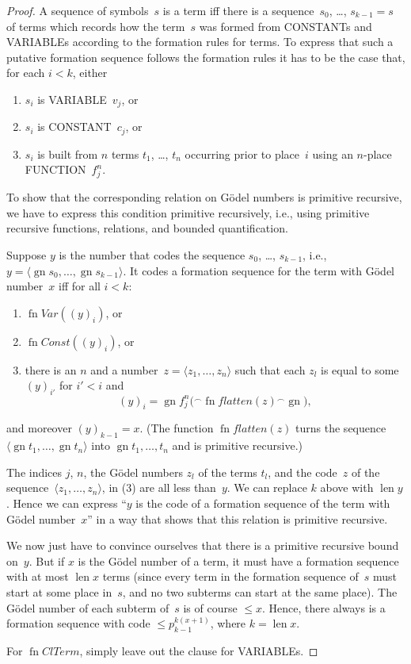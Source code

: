 \documentclass[10pt,a4paper]{article}
\newcommand*{\olup}[1]{\MakeUppercase{#1}}
\theoremstyle{plain}
\theoremstyle{definition}
\theoremstyle{remark}
\providecommand{\Obj}{}
\providecommand{\tuple}[1]{\langle #1 \rangle}
\providecommand{\len}{\operatorname{len}}
\providecommand{\concat}{\mathbin{{}^\frown}}
\providecommand{\Gn}{\operatorname{gn}}
\providecommand{\fn}{\operatorname{fn}}
\begin{document}
\begin{proof}
A sequence of symbols~$s$ is a term iff there is a sequence~$s_0$,
\dots, $s_{k-1} = s$ of terms which records how the term~$s$ was formed
from \olup{constant}s and \olup{variable}s according to the formation rules
for terms. To express that such a putative formation sequence follows
the formation rules it has to be the case that, for each $i < k$, either
\begin{enumerate}
\item $s_i$ is \olup{variable}~$\Obj v_j$, or
\item $s_i$ is \olup{constant}~$\Obj c_j$, or
\item $s_i$ is built from $n$ terms $t_1$, \dots, $t_n$ occurring
  prior to place~$i$ using an $n$-place \olup{function}~$\Obj f^n_j$.
\end{enumerate}
To show that the corresponding relation on G\"odel numbers is
primitive recursive, we have to express this condition primitive
recursively, i.e., using primitive recursive functions, relations, and
bounded quantification.

Suppose $y$ is the number that codes the sequence $s_0$, \dots, $s_{k-1}$,
i.e., $y = \tuple{\Gn{s_0}, \dots, \Gn{s_{k-1}}}$.  It codes a formation
sequence for the term with G\"odel number~$x$ iff for all $i < k$:
\begin{enumerate}
\item $\fn{Var}((y)_i)$, or
\item $\fn{Const}((y)_i)$, or
\item there is an $n$ and a number~$z = \tuple{z_1, \dots, z_n}$ such
  that each $z_l$ is equal to some $(y)_{i'}$ for $i' < i$ and
\[
(y)_i = \Gn{\Obj f^n_j(} \concat \fn{flatten}(z) \concat \Gn{)},
\]
\end{enumerate}
and moreover $(y)_{k-1} = x$.  (The function $\fn{flatten}(z)$ turns
the sequence $\tuple{\Gn{t_1}, \dots, \Gn{t_n}}$ into $\Gn{t_1, \dots,
  t_n}$ and is primitive recursive.)

The indices $j$, $n$, the G\"odel numbers $z_l$ of the terms $t_l$,
and the code~$z$ of the sequence~$\tuple{z_1, \dots, z_n}$, in (3) are
all less than~$y$.  We can replace $k$ above with $\len{y}$.  Hence we
can express ``$y$ is the code of a formation sequence of the term with
G\"odel number~$x$'' in a way that shows that this relation is
primitive recursive.

We now just have to convince ourselves that there is a primitive
recursive bound on~$y$.  But if $x$ is the G\"odel number of a term,
it must have a formation sequence with at most $\len{x}$ terms (since
every term in the formation sequence of~$s$ must start at some place
in~$s$, and no two subterms can start at the same place).  The G\"odel
number of each subterm of~$s$ is of course $\le x$.  Hence, there
always is a formation sequence with code $\le p_{k-1}^{k(x+1)}$, where
$k=\len{x}$.

For $\fn{ClTerm}$, simply leave out the clause for \olup{variable}s.
\end{proof}
\end{document}
